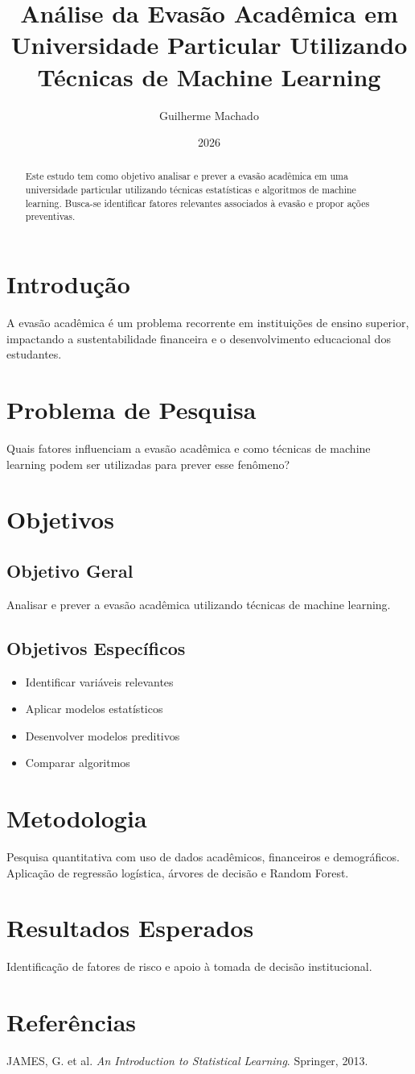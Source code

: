 \documentclass[12pt,a4paper]{article}
\title{Análise da Evasão Acadêmica em Universidade Particular Utilizando Técnicas de Machine Learning}
\author{Guilherme Machado}
\date{2026}
\begin{document}
\maketitle

\begin{abstract}
Este estudo tem como objetivo analisar e prever a evasão acadêmica em uma universidade particular utilizando técnicas estatísticas e algoritmos de machine learning. Busca-se identificar fatores relevantes associados à evasão e propor ações preventivas.
\end{abstract}

\section{Introdução}
A evasão acadêmica é um problema recorrente em instituições de ensino superior, impactando a sustentabilidade financeira e o desenvolvimento educacional dos estudantes.

\section{Problema de Pesquisa}
Quais fatores influenciam a evasão acadêmica e como técnicas de machine learning podem ser utilizadas para prever esse fenômeno?

\section{Objetivos}

\subsection{Objetivo Geral}
Analisar e prever a evasão acadêmica utilizando técnicas de machine learning.

\subsection{Objetivos Específicos}
\begin{itemize}
\item Identificar variáveis relevantes
\item Aplicar modelos estatísticos
\item Desenvolver modelos preditivos
\item Comparar algoritmos
\end{itemize}

\section{Metodologia}
Pesquisa quantitativa com uso de dados acadêmicos, financeiros e demográficos. Aplicação de regressão logística, árvores de decisão e Random Forest.

\section{Resultados Esperados}
Identificação de fatores de risco e apoio à tomada de decisão institucional.

\section{Referências}
JAMES, G. et al. \textit{An Introduction to Statistical Learning}. Springer, 2013.
\end{document}
